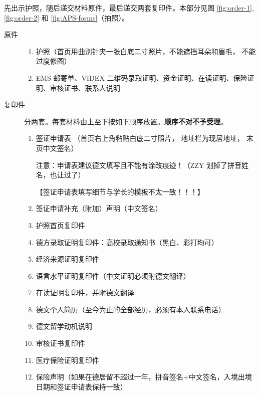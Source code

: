 \documentclass[oneside,final]{book}
\begin{document}
先出示护照，随后递交材料原件，最后递交两套复印件。本部分见图 \ref{fig:order-1}, \ref{fig:order-2} 和 \ref{fig:APS-forms}（拍照）。
\begin{description}
  \item[原件]
  \begin{enumerate}
    \item 护照（首页用曲别针夹一张白底二寸照片，不能遮挡耳朵和眉毛， 不能过度修图） 
    \item EMS 邮寄单、VIDEX 二维码录取证明、资金证明、在读证明、保险证明、审核证书、联系人说明
  \end{enumerate} 
  \item[复印件] 分两套。每套材料由上至下按如下顺序放置。\textbf{\color{red}顺序不对不予受理}。 
  \begin{enumerate}
    \item 签证申请表 （首页右上角粘贴白底二寸照片， 地址栏为现居地址， 末页中文签名） 

    注意：申请表建议德文填写且不能有涂改痕迹！（ZZY 划掉了拼音姓名，也让过了） 
    
    【签证申请表填写细节与学长的模板不太一致！！！】 
    
    \item 签证申请补充（附加）声明（中文签名） 
    
    \item 护照首页复印件 
    
    \item 德方录取证明复印件：高校录取通知书（黑白、彩打均可）
    
    \item 经济来源证明复印件 
    
    \item 语言水平证明复印件（中文证明必须附德文翻译） 
    
    \item 在读证明复印件，并附德文翻译 
    
    \item 德文个人简历（至今为止的全部经历，必须有本人联系电话） 
    
    \item 德文留学动机说明 
    
    \item 审核证书复印件 
    
    \item 医疗保险证明复印件 
    
    \item 保险声明（如果在德居留不超过一年，拼音签名+中文签名，入境出境日期和签证申请表保持一致）
  \end{enumerate} 
\end{description} 
\end{document}
